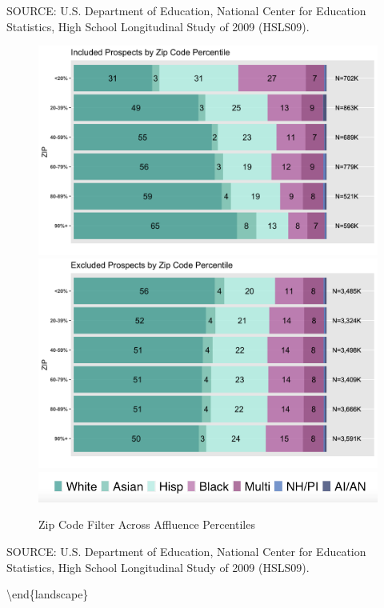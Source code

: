 \documentclass[
  12pt,
]{article}
\begin{document}
\begingroup
\fontsize{8}{8}\selectfont

SOURCE: U.S. Department of Education, National Center for Education Statistics, High School Longitudinal Study of 2009 (HSLS09).
\endgroup

\begin{figure}

{\centering \includegraphics[width=0.4\linewidth]{./../../outputs/figures/p3_zip_incV2} \includegraphics[width=0.4\linewidth]{./../../outputs/figures/p3_zip_excV2} \includegraphics[width=0.4\linewidth]{./../../outputs/figures/legend_horizontal} 

}

\caption{Zip Code Filter Across Affluence Percentiles}\label{fig:zipcode-affluence}
\end{figure}

\begingroup
\fontsize{8}{8}\selectfont

SOURCE: U.S. Department of Education, National Center for Education Statistics, High School Longitudinal Study of 2009 (HSLS09).
\endgroup

\textbackslash end\{landscape\}
\pagebreak
\restoregeometry
\end{document}
